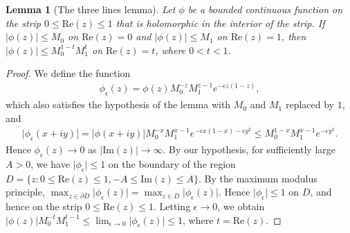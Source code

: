 \documentclass{article}
\numberwithin{equation}{section}
\renewcommand{\Re}{\mathrm{Re}}
\renewcommand{\Im}{\mathrm{Im}}
\theoremstyle{plain}
\newtheorem{lemma}[theorem]{Lemma}
\theoremstyle{definition}
\begin{document}
\begin{lemma}[The three lines lemma]\label{rieszthorinlemma1}
	Let $\phi$ be a bounded continuous function on the strip $0\leq\Re(z)\leq 1$ that is holomorphic in the interior of the strip. If $\vert\phi(z)\vert\leq M_0$ on $\Re(z)=0$ and $\vert\phi(z)\vert\leq M_1$ on $\Re(z)=1$, then $\vert\phi(z)\vert\leq M_0^{1-t}M_1^{t}$ on $\Re(z)=t$, where $0<t<1$.
\end{lemma}
\begin{proof}
	We define the function
	\begin{align*}
		\phi_\epsilon(z)=\phi(z)M_0^{-z}M_1^{z-1}e^{-\epsilon z(1-z)},
	\end{align*}
	which also satisfies the hypothesis of the lemma with $M_0$ and $M_1$ replaced by $1$, and 
	\begin{align*}
		\vert\phi_\epsilon(x+iy)\vert=\vert \phi(x+iy)\vert M_0^{-x}M_1^{x-1}e^{-\epsilon x(1-x)-\epsilon y^2}\leq M_0^{1-x}M_1^{x-1}e^{-\epsilon y^2}.
	\end{align*}
	Hence $\phi_\epsilon(z)\to 0$ as $\vert\Im(z)\vert\to\infty$. By our hypothesis, for sufficiently large $A>0$, we have $\vert\phi_\epsilon\vert\leq 1$ on the boundary of the region $D=\{z:0\leq\Re(z)\leq 1,-A\leq\Im(z)\leq A\}$. By the maximum modulus principle, $\max_{z\in\partial D}\vert\phi_\epsilon(z)\vert=\max_{z\in D}\vert\phi_\epsilon(z)\vert$. Hence $\vert\phi_\epsilon\vert\leq 1$ on $D$, and hence on the strip $0\leq\Re(z)\leq 1$. Letting $\epsilon\to 0$, we obtain $\vert\phi(z)\vert M_0^{-t}M_1^{t-1}\leq\lim_{\epsilon\to 0}\vert\phi_\epsilon(z)\vert\leq 1$, where $t=\Re(z)$. 
\end{proof}
\end{document}
